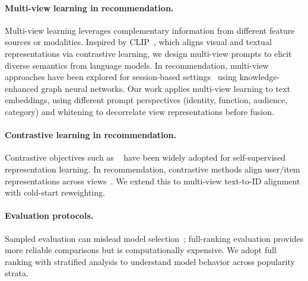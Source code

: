 \paragraph{Multi-view learning in recommendation.}
Multi-view learning leverages complementary information from
different feature sources or modalities. Inspired by
CLIP~\cite{radford2021clip}, which aligns visual and textual
representations via contrastive learning, we design multi-view
prompts to elicit diverse semantics from language models. In
recommendation, multi-view approaches have been explored for
session-based settings~\cite{wang2023kgmvgnn} using
knowledge-enhanced graph neural networks. Our work applies
multi-view learning to \llm text embeddings, using different
prompt perspectives (identity, function, audience, category)
and whitening to decorrelate view representations before
fusion.

\paragraph{Contrastive learning in recommendation.}
Contrastive objectives such as \InfoNCE~\cite{oord2018cpc}
have been widely adopted for self-supervised representation
learning. In recommendation, contrastive methods align
user/item representations across views~\cite{wu2021cl4rec}.
We extend this to multi-view text-to-ID alignment with
cold-start reweighting.

\paragraph{Evaluation protocols.}
Sampled evaluation can mislead model
selection~\cite{krichene2020sampledmetrics}; full-ranking
evaluation provides more reliable comparisons but is
computationally expensive. We adopt full ranking with
stratified analysis to understand model behavior across
popularity strata.

